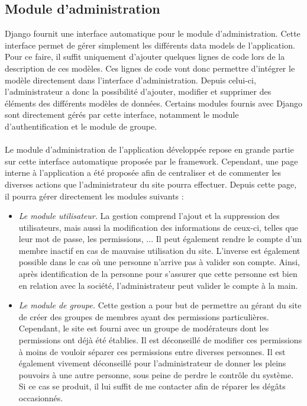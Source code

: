 \documentclass[12pt, a4paper, oneside]{article}
\begin{document}
{{%
\subsection{Module d'administration} \label{admin}
    \indent Django fournit une interface automatique pour le module d'administration. Cette interface permet de gérer simplement les différents data models de l'application. Pour ce faire, il suffit uniquement d'ajouter quelques lignes de code lors de la description de ces modèles. Ces lignes de code vont donc permettre d'intégrer le modèle directement dans l'interface d'administration. Depuis celui-ci, l'administrateur a donc la possibilité d'ajouter, modifier et supprimer des éléments des différents modèles de données. Certains modules fournis avec Django sont directement gérés par cette interface, notamment le module d'authentification et le module de groupe.\\\\
    \indent Le module d'administration de l'application développée repose en grande partie sur cette interface automatique proposée par le framework. Cependant, une page interne à l'application a été proposée afin de centraliser et de commenter les diverses actions que l'administrateur du site pourra effectuer. Depuis cette page, il pourra gérer directement les modules suivants :\\
    \begin{itemize}
        \item \textit{Le module utilisateur.} La gestion comprend l'ajout et la suppression des utilisateurs, mais aussi la modification des informations de ceux-ci, telles que leur mot de passe, les permissions, ... Il peut également rendre le compte d'un membre inactif en cas de mauvaise utilisation du site. L'inverse est également possible dans le cas où une personne n'arrive pas à valider son compte. Ainsi, après identification de la personne pour s'assurer que cette personne est bien en relation avec la société, l'administrateur peut valider le compte à la main.\\
        \item \textit{Le module de groupe.} Cette gestion a pour but de permettre au gérant du site de créer des groupes de membres ayant des permissions particulières. Cependant, le site est fourni avec un groupe de modérateurs dont les permissions ont déjà été établies. Il est déconseillé de modifier ces permissions à moins de vouloir séparer ces permissions entre diverses personnes. Il est également vivement déconseillé pour l'administrateur de donner les pleins pouvoirs à une autre personne, sous peine de perdre le contrôle du système. Si ce cas se produit, il lui suffit de me contacter afin de réparer les dégâts occasionnés.\\

\end{itemize}}}
\end{document}
